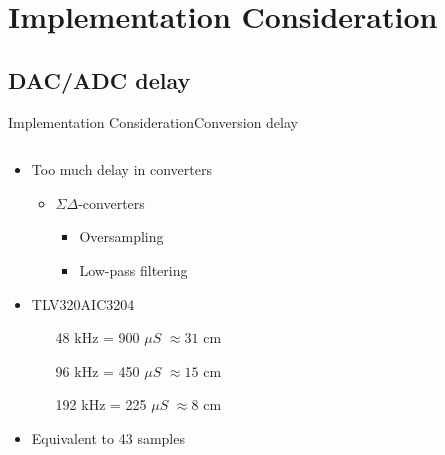 \section{Implementation Consideration}
\subsection{DAC/ADC delay}
\begin{frame}{Implementation Consideration}{Conversion delay}
	\begin{columns}
		\begin{column}{0.4\textwidth}
		\begin{itemize}
		\item Too much delay in converters
				\begin{itemize}
				\item $\Sigma \Delta$-converters
				\begin{itemize}
				\item Oversampling
				\item Low-pass filtering
				\end{itemize}								
				\end{itemize}
		\item TLV320AIC3204
				\begin{itemize}
				\item[48 kHz]= 900 $\mu S$ $\approx 31$ cm
				\item[96 kHz]= 450 $\mu S$ $\approx 15$ cm
				\item[192 kHz]= 225 $\mu S$ $\approx 8$ cm
				\end{itemize}			 
		\item Equivalent to 43 samples
		\end{itemize}
		\end{column}
		\begin{column}{0.6\textwidth} 
		\begin{center}
		
		\end{center}
		\end{column}
	\end{columns}

\end{frame}
